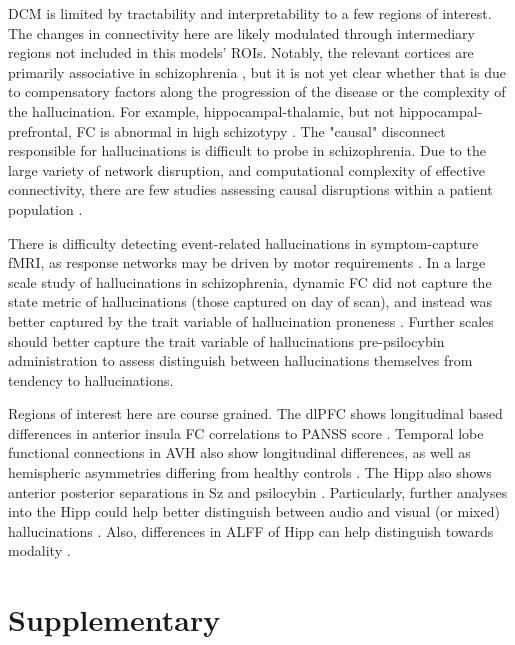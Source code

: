 \documentclass{article}
\begin{document}
DCM is limited by tractability and interpretability to a few regions of interest. The changes in connectivity here are likely modulated through intermediary regions not included in this models' ROIs. Notably, the relevant cortices are primarily associative in schizophrenia \cite{leptourgos_hallucinations_2020}, but it is not yet clear whether that is due to compensatory factors along the progression of the disease or the complexity of the hallucination. For example, hippocampal-thalamic, but not hippocampal-prefrontal, FC is abnormal in high schizotypy \citep{p_high_2021}. The "causal" disconnect responsible for hallucinations is difficult to probe in schizophrenia. Due to the large variety of network disruption, and computational complexity of effective connectivity, there are few studies assessing causal disruptions within a patient population \citep{curcic-blake_interaction_2017}. 

There is difficulty detecting event-related hallucinations in symptom-capture fMRI, as response networks may be driven by motor requirements \citep{gill_real-time_2022}. In a large scale study of hallucinations in schizophrenia, dynamic FC did not capture the state metric of hallucinations (those captured on day of scan), and instead was better captured by the trait variable of hallucination proneness \citep{weber_dynamic_2020}. Further scales should better capture the trait variable of hallucinations pre-psilocybin administration to assess distinguish between hallucinations themselves from tendency to hallucinations. 

Regions of interest here are course grained. The dlPFC shows longitudinal based differences in anterior insula FC correlations to PANSS score \citep{chechko_differential_2018}. Temporal lobe functional connections in AVH also show longitudinal differences, as well as hemispheric asymmetries differing from healthy controls \citep{zaykova_lateralized_2025}. The Hipp also shows anterior posterior separations in Sz \citep{blessing_anterior_2020} and psilocybin \citep{stoliker_neural_2025}. Particularly, further analyses into the Hipp could help better distinguish between audio and visual (or mixed) hallucinations \citep{cachia_deviations_2020}. Also, differences in ALFF of Hipp can help distinguish towards modality \citep{hare_modality-dependent_2017}. 

\section{Supplementary}



\end{document}
